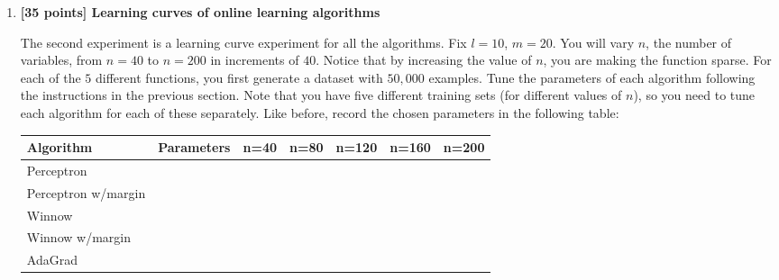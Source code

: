 \begin{enumerate}
\begin{enumerate}
\item Plot the cumulative number of mistakes made (W) on N examples ($\le 50,000$) as a function of N (i.e. x-axis is N and y-axis is W)\footnote{If you are running out of memory, you may consider plotting the cumulative error at every 100 examples seen instead.}
\end{enumerate}

For each of the two datasets (n=500 and n=1000), plot the curves of
all five algorithms in one graph. Therefore, you should have two
graphs (one for each dataset) with five curves on each. Be sure to
label your graphs clearly!

{\bf Comment: }If you are getting results that seem to be unexpected
after tweaking the algorithm parameters, try increasing the number of
examples.  If you choose to do so, don't forget to document the
attempt as well.  It is alright to have an additional graph or two as
a part of the documentation.


\item {\bf [35 points] Learning curves of online learning algorithms}

The second experiment is a learning curve experiment for all the
algorithms.  Fix $l=10$, $m=20$.  You will vary $n$, the number of
variables, from $n=40$ to $n=200$ in increments of $40$.  Notice that 
by increasing the value of $n$, you are making the function sparse.  
For each of the $5$ different functions, you first generate a dataset with
$50,000$ examples.  Tune the parameters of each algorithm following
the instructions in the previous section. Note that you have five
different training sets (for different values of $n$), so you need to tune each algorithm for each
of these separately. Like before, record the chosen parameters in the
following table:

  \begin{center}
    \begin{tabular}{|p{3.0cm}|p{2.2cm}|p{1cm}|p{1cm}|p{1cm}|p{1cm}|p{1cm}|}
      \hline
      Algorithm             &  Parameters & n=40 & n=80 & n=120 & n=160 & n=200\\\hline\hline
      Perceptron            &             &      &      &       &       &      \\\hline
      Perceptron w/margin   &             &      &      &       &       &      \\\hline
      Winnow                &             &      &      &       &       &      \\\hline
      Winnow w/margin       &             &      &      &       &       &      \\\hline
      AdaGrad               &             &      &      &       &       &      \\\hline
    \end{tabular}
  \end{center}
  

\end{enumerate}
